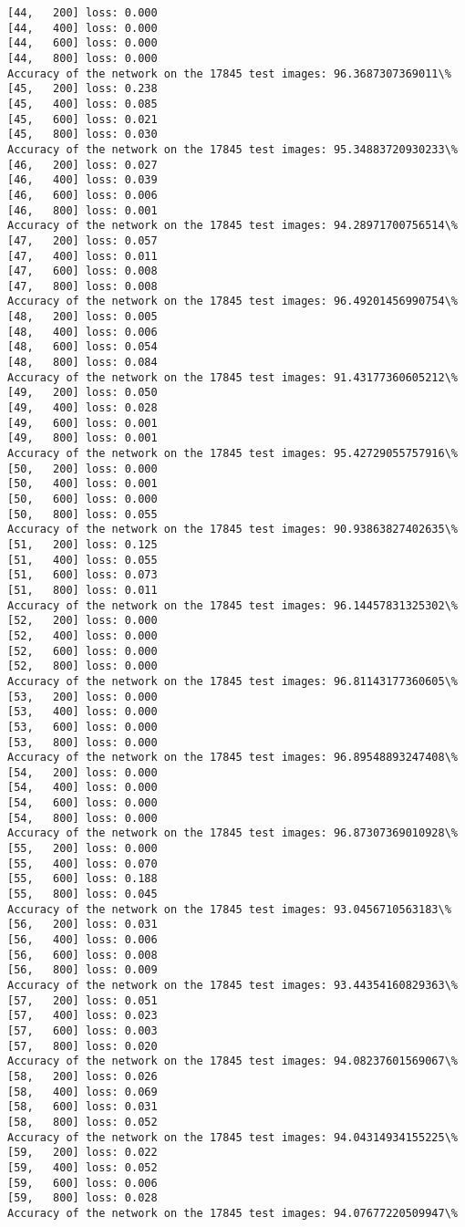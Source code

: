 \documentclass[11pt]{article}
\begin{document}
\begin{Verbatim}[commandchars=\\\{\}]
[44,   200] loss: 0.000
[44,   400] loss: 0.000
[44,   600] loss: 0.000
[44,   800] loss: 0.000
Accuracy of the network on the 17845 test images: 96.3687307369011\%
[45,   200] loss: 0.238
[45,   400] loss: 0.085
[45,   600] loss: 0.021
[45,   800] loss: 0.030
Accuracy of the network on the 17845 test images: 95.34883720930233\%
[46,   200] loss: 0.027
[46,   400] loss: 0.039
[46,   600] loss: 0.006
[46,   800] loss: 0.001
Accuracy of the network on the 17845 test images: 94.28971700756514\%
[47,   200] loss: 0.057
[47,   400] loss: 0.011
[47,   600] loss: 0.008
[47,   800] loss: 0.008
Accuracy of the network on the 17845 test images: 96.49201456990754\%
[48,   200] loss: 0.005
[48,   400] loss: 0.006
[48,   600] loss: 0.054
[48,   800] loss: 0.084
Accuracy of the network on the 17845 test images: 91.43177360605212\%
[49,   200] loss: 0.050
[49,   400] loss: 0.028
[49,   600] loss: 0.001
[49,   800] loss: 0.001
Accuracy of the network on the 17845 test images: 95.42729055757916\%
[50,   200] loss: 0.000
[50,   400] loss: 0.001
[50,   600] loss: 0.000
[50,   800] loss: 0.055
Accuracy of the network on the 17845 test images: 90.93863827402635\%
[51,   200] loss: 0.125
[51,   400] loss: 0.055
[51,   600] loss: 0.073
[51,   800] loss: 0.011
Accuracy of the network on the 17845 test images: 96.14457831325302\%
[52,   200] loss: 0.000
[52,   400] loss: 0.000
[52,   600] loss: 0.000
[52,   800] loss: 0.000
Accuracy of the network on the 17845 test images: 96.81143177360605\%
[53,   200] loss: 0.000
[53,   400] loss: 0.000
[53,   600] loss: 0.000
[53,   800] loss: 0.000
Accuracy of the network on the 17845 test images: 96.89548893247408\%
[54,   200] loss: 0.000
[54,   400] loss: 0.000
[54,   600] loss: 0.000
[54,   800] loss: 0.000
Accuracy of the network on the 17845 test images: 96.87307369010928\%
[55,   200] loss: 0.000
[55,   400] loss: 0.070
[55,   600] loss: 0.188
[55,   800] loss: 0.045
Accuracy of the network on the 17845 test images: 93.0456710563183\%
[56,   200] loss: 0.031
[56,   400] loss: 0.006
[56,   600] loss: 0.008
[56,   800] loss: 0.009
Accuracy of the network on the 17845 test images: 93.44354160829363\%
[57,   200] loss: 0.051
[57,   400] loss: 0.023
[57,   600] loss: 0.003
[57,   800] loss: 0.020
Accuracy of the network on the 17845 test images: 94.08237601569067\%
[58,   200] loss: 0.026
[58,   400] loss: 0.069
[58,   600] loss: 0.031
[58,   800] loss: 0.052
Accuracy of the network on the 17845 test images: 94.04314934155225\%
[59,   200] loss: 0.022
[59,   400] loss: 0.052
[59,   600] loss: 0.006
[59,   800] loss: 0.028
Accuracy of the network on the 17845 test images: 94.07677220509947\%

\end{Verbatim}
\end{document}
